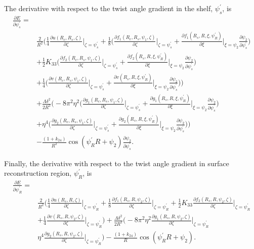 \documentclass[12pt]{article}
\begin{document}
The derivative with respect to the twist angle gradient in the shelf, $\psi_s^{\prime}$, is
\begin{align}
\frac{\partial E}{\partial \psi_s^{\prime}}=&\nonumber\\
&\frac{2}{R^2}\bigg(\frac{1}{4}\frac{\partial u(R_c,R_s,\zeta)}{\partial\zeta}\bigg|_{\zeta=\psi_s^{\prime}}+\frac{1}{8}\bigg(\frac{\partial f_1(R_c,R_s,\psi_1,\zeta)}{\partial\zeta}\bigg|_{\zeta=\psi_s^{\prime}}+\frac{\partial f_1(R_s,R,\xi,\psi_R^{\prime})}{\partial\xi}\bigg|_{\xi=\psi_2}\frac{\partial\psi_2}{\partial\psi_s^{\prime}}\bigg)\nonumber\\
&+\frac{1}{2}K_{33}\bigg(\frac{\partial f_2(R_c,R_s,\psi_1,\zeta)}{\partial\zeta}\bigg|_{\zeta=\psi_s^{\prime}}+\frac{\partial f_2(R_s,R,\xi,\psi_R^{\prime})}{\partial\xi}\bigg|_{\xi=\psi_2}\frac{\partial\psi_2}{\partial\psi_s^{\prime}}\bigg)\nonumber\\
&+\frac{1}{4}\bigg(\frac{\partial v(R_c,R_s,\psi_1,\zeta)}{\partial\zeta}\bigg|_{\zeta=\psi_s^{\prime}}+\frac{\partial v(R_s,R,\xi,\psi_R^{\prime})}{\partial\xi}\bigg|_{\xi=\psi_2}\frac{\partial\psi_2}{\partial\psi_s^{\prime}}\bigg)\bigg)\nonumber\\
&+\frac{\Lambda\delta^2}{2R^2}\bigg(-8\pi^2\eta^2\bigg(\frac{\partial g_1(R_c,R_s,\psi_1,\zeta)}{\partial\zeta}\bigg|_{\zeta=\psi_s^{\prime}}+\frac{\partial g_1(R_s,R,\xi,\psi_R^{\prime})}{\partial\xi}\bigg|_{\xi=\psi_2}\frac{\partial\psi_2}{\partial\psi_s^{\prime}}\bigg)\nonumber\\
&+\eta^4\bigg(\frac{\partial g_2(R_c,R_s,\psi_1,\zeta)}{\partial\zeta}\bigg|_{\zeta=\psi_s^{\prime}}+\frac{\partial g_2(R_s,R,\xi,\psi_R^{\prime})}{\partial\xi}\bigg|_{\xi=\psi_2}\frac{\partial\psi_2}{\partial\psi_s^{\prime}}\bigg)\bigg)\nonumber\\
&-\frac{(1+k_{24})}{R^2}\cos(\psi_R^{\prime}R+\psi_2)\frac{\partial\psi_2}{\partial\psi_s^{\prime}}.\label{eq:dEdpsi_sp}
\end{align}

Finally, the derivative with respect to the twist angle gradient in surface reconstruction region, $\psi_R^{\prime}$, is
\begin{align}
\frac{\partial E}{\partial \psi_R^{\prime}}=&\nonumber\\
&\frac{2}{R^2}\bigg(\frac{1}{4}\frac{\partial u(R_s,R,\zeta)}{\partial\zeta}\bigg|_{\zeta=\psi_R^{\prime}}+\frac{1}{8}\frac{\partial f_1(R_s,R,\psi_2,\zeta)}{\partial\zeta}\bigg|_{\zeta=\psi_R^{\prime}}+\frac{1}{2}K_{33}\frac{\partial f_2(R_s,R,\psi_2,\zeta)}{\partial\zeta}\bigg|_{\zeta=\psi_R^{\prime}}\nonumber\\
&+\frac{1}{4}\frac{\partial v(R_s,R,\psi_2,\zeta)}{\partial\zeta}\bigg|_{\zeta=\psi_R^{\prime}}\bigg)+\frac{\Lambda\delta^2}{2R^2}\bigg(-8\pi^2\eta^2\frac{\partial g_1(R_s,R,\psi_2,\zeta)}{\partial\zeta}\bigg|_{\zeta=\psi_R^{\prime}}\nonumber\\
&\eta^4\frac{\partial g_2(R_s,R,\psi_2,\zeta)}{\partial\zeta}\bigg|_{\zeta=\psi_R^{\prime}}\bigg)-\frac{(1+k_{24})}{R}\cos(\psi_R^{\prime}R+\psi_2).\label{eq:dEdpsi_Rc}
\end{align}
\end{document}
